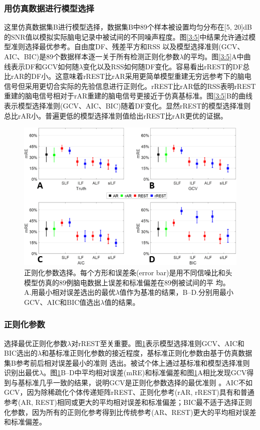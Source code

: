 \subsubsection{用仿真数据进行模型选择}
这里仿真数据集B进行模型选择，数据集B中89个样本被设置均匀分布在[5, 20]dB的SNR值以模拟实际脑电记录中被试间的不同噪声程度。图\ref{3:5}中结果允许通过模型准则选择最优参考。自由度DF、残差平方和RSS
以及模型选择准则(GCV、AIC、BIC)是89个数据样本逐一关于所有检测正则化参数$\lambda$的平均。图\ref{3:5}A中曲线表示DF和GCV如何随$\lambda$变化以及RSS如何随DF变化。容易看出rREST的DF总比rAR的DF小。这意味着rREST比rAR采用更简单模型重建无穷远参考下的脑电信号但采用更切合实际的先验信息进行正则化。rREST比rAR低的RSS表明rREST重建的脑电信号相对于rAR重建的脑电信号更接近于仿真基标准。图\ref{3:5}B的曲线表示模型选择准则(GCV、AIC、BIC)随着DF变化。显然rREST的模型选择准则总比rAR小。普遍更低的模型选择准则值给出rREST比rAR更优的证据。
\begin{figure}[!h]
	\centering
	\includegraphics[width=15cm]{pic/Frontier/figure6.png}
	\caption{正则化参数选择。每个方形和误差条(error bar)是用不同信噪比和头模型仿真的89例脑电数据上误差和标准偏差在89例被试间的平
	均。A.用最小相对误差选出的最优$\lambda$值作为基准的结果，B–D.分别用最小GCV、AIC和BIC值选出$\lambda$值的结果。}
	\label{3:6}
\end{figure}

\subsubsection{正则化参数}
选择最优正则化参数$\lambda$对rREST至关重要。图\ref{3:6}表示模型选择准则GCV、AIC和BIC选出的$\lambda$和基标准正则化参数的接近程度，基标准正则化参数由基于仿真数据集B参考前后相对误差最小的准则
选出。被试个体上通过基标准和模型选择准则识别出最优$\lambda$。图\ref{3:6}B–D中平均相对误差(mRE)和标准偏差和图\ref{3:6}A相比发现GCV得到与基标准几乎一致的结果，说明GCV是正则化参数选择的最优准则
。AIC不如GCV，因为除稀疏化个体传递矩阵rREST、正则化参考(rAR, rREST)具有和普通参考(AR, REST)相同或更大的平均相对误差和标准偏差；BIC最不适于选择正则化参数，因为所有的正则化参考得到比传统参考(AR、REST)更大的平均相对误差和标准偏差。

